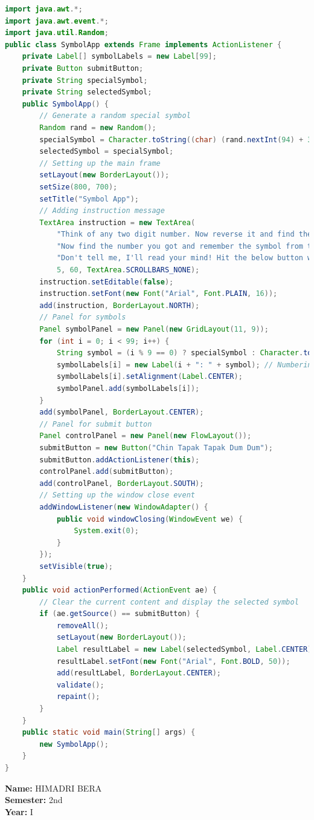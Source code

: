 \documentclass[12pt]{article}
\begin{document}
 \begin{lstlisting}[language=JAVA, caption={STT}]
import java.awt.*;
import java.awt.event.*;
import java.util.Random;
public class SymbolApp extends Frame implements ActionListener {
    private Label[] symbolLabels = new Label[99];
    private Button submitButton;
    private String specialSymbol;
    private String selectedSymbol;
    public SymbolApp() {
        // Generate a random special symbol
        Random rand = new Random();
        specialSymbol = Character.toString((char) (rand.nextInt(94) + 33)); // Random ASCII character from 33 to 126
        selectedSymbol = specialSymbol;
        // Setting up the main frame
        setLayout(new BorderLayout());
        setSize(800, 700);
        setTitle("Symbol App");
        // Adding instruction message
        TextArea instruction = new TextArea(
            "Think of any two digit number. Now reverse it and find the difference of them.\n" +
            "Now find the number you got and remember the symbol from the panel below.\n" +
            "Don't tell me, I'll read your mind! Hit the below button when you are ready to see the magic!",
            5, 60, TextArea.SCROLLBARS_NONE);
        instruction.setEditable(false);
        instruction.setFont(new Font("Arial", Font.PLAIN, 16));
        add(instruction, BorderLayout.NORTH);
        // Panel for symbols
        Panel symbolPanel = new Panel(new GridLayout(11, 9));
        for (int i = 0; i < 99; i++) {
            String symbol = (i % 9 == 0) ? specialSymbol : Character.toString((char) (33 + (i % 94)));
            symbolLabels[i] = new Label(i + ": " + symbol); // Numbering symbols
            symbolLabels[i].setAlignment(Label.CENTER);
            symbolPanel.add(symbolLabels[i]);
        }
        add(symbolPanel, BorderLayout.CENTER);
        // Panel for submit button
        Panel controlPanel = new Panel(new FlowLayout());
        submitButton = new Button("Chin Tapak Tapak Dum Dum");
        submitButton.addActionListener(this);
        controlPanel.add(submitButton);
        add(controlPanel, BorderLayout.SOUTH);
        // Setting up the window close event
        addWindowListener(new WindowAdapter() {
            public void windowClosing(WindowEvent we) {
                System.exit(0);
            }
        });
        setVisible(true);
    }
    public void actionPerformed(ActionEvent ae) {
        // Clear the current content and display the selected symbol
        if (ae.getSource() == submitButton) {
            removeAll();
            setLayout(new BorderLayout());
            Label resultLabel = new Label(selectedSymbol, Label.CENTER);
            resultLabel.setFont(new Font("Arial", Font.BOLD, 50));
            add(resultLabel, BorderLayout.CENTER);
            validate();
            repaint();
        }
    }
    public static void main(String[] args) {
        new SymbolApp();
    }
} 
\end{lstlisting}
\begin{flushright}
\textbf{Name:} HIMADRI BERA \\
\textbf{Semester:} 2nd \\
\textbf{Year:} I \\
\end{flushright}
\end{document}
